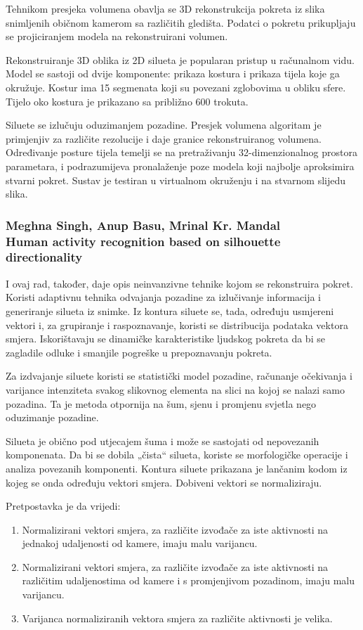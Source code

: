 \documentclass[times, utf8, diplomski]{fer}
\begin{document}
Tehnikom presjeka volumena obavlja se 3D rekonstrukcija pokreta iz slika snimljenih
običnom kamerom sa različitih gledišta. Podatci o pokretu prikupljaju se projiciranjem modela
na rekonstruirani volumen.

Rekonstruiranje 3D oblika iz 2D silueta je popularan pristup u računalnom vidu. Model se
sastoji od dvije komponente: prikaza kostura i prikaza tijela koje ga okružuje. Kostur ima 15
segmenata koji su povezani zglobovima u obliku sfere. Tijelo oko kostura je prikazano sa približno
600 trokuta.

Siluete se izlučuju oduzimanjem pozadine. Presjek volumena algoritam je primjenjiv za
različite rezolucije i daje granice rekonstruiranog volumena.
Određivanje posture tijela temelji se na pretraživanju 32-dimenzionalnog prostora parametara,
i podrazumijeva pronalaženje poze modela koji najbolje aproksimira stvarni pokret.
Sustav je testiran u virtualnom okruženju i na stvarnom slijedu slika.

\subsubsection{ 
Meghna Singh, Anup Basu, Mrinal Kr. Mandal\\
Human activity recognition based on silhouette directionality
 }
 
I ovaj rad, također, daje opis neinvanzivne tehnike kojom se rekonstruira pokret. Koristi
adaptivnu tehnika odvajanja pozadine za izlučivanje informacija i generiranje silueta iz
snimke. Iz kontura siluete se, tada, određuju usmjereni vektori i, za grupiranje i
raspoznavanje, koristi se distribucija podataka vektora smjera. Iskorištavaju se dinamičke
karakteristike ljudskog pokreta da bi se zagladile odluke i smanjile pogreške u prepoznavanju
pokreta.

Za izdvajanje siluete koristi se statistički model pozadine, računanje očekivanja i varijance
intenziteta svakog slikovnog elementa na slici na kojoj se nalazi samo pozadina. Ta je metoda
otpornija na šum, sjenu i promjenu svjetla nego oduzimanje pozadine.

Silueta je obično pod utjecajem šuma i može se sastojati od nepovezanih komponenata. Da bi
se dobila „čista“ silueta, koriste se morfologičke operacije i analiza povezanih komponenti.
Kontura siluete prikazana je lančanim kodom iz kojeg se onda određuju vektori smjera.
Dobiveni vektori se normaliziraju.

Pretpostavka je da vrijedi: 

\begin{enumerate}
\item Normalizirani vektori smjera, za različite izvođače za iste aktivnosti na jednakoj
udaljenosti od kamere, imaju malu varijancu.
\item Normalizirani vektori smjera, za različite izvođače za iste aktivnosti na različitim
udaljenostima od kamere i s promjenjivom pozadinom, imaju malu varijancu.
\item Varijanca normaliziranih vektora smjera za različite aktivnosti je velika.
\end{enumerate}
\end{document}
